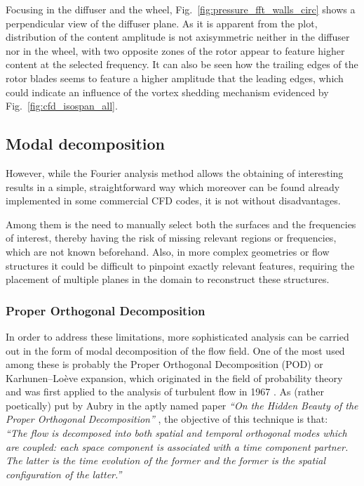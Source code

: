 Focusing in the diffuser and the wheel, Fig.~\ref{fig:pressure_fft_walls_circ} shows a perpendicular view of the diffuser plane. As it is apparent from the plot, distribution of the content amplitude is not axisymmetric neither in the diffuser nor in the wheel, with two opposite zones of the rotor appear to feature higher content at the selected frequency. It can also be seen how the trailing edges of the rotor blades seems to feature a higher amplitude that the leading edges, which could indicate an influence of the vortex shedding mechanism evidenced by Fig.~\ref{fig:cfd_isospan_all}.

\subsection{Modal decomposition}

However, while the Fourier analysis method allows the obtaining of interesting results in a simple, straightforward way which moreover can be found already implemented in some commercial CFD codes, it is not without disadvantages.

Among them is the need to manually select both the surfaces and the frequencies of interest, thereby having the risk of missing relevant regions or frequencies, which are not known beforehand. Also, in more complex geometries or flow structures it could be difficult to pinpoint exactly relevant features, requiring the placement of multiple planes in the domain to reconstruct these structures.

\subsubsection{Proper Orthogonal Decomposition}

In order to address these limitations, more sophisticated analysis can be carried out in the form of modal decomposition of the flow field. One of the most used among these is probably the Proper Orthogonal Decomposition (POD) or Karhunen--Loève expansion, which originated in the field of probability theory and was first applied to the analysis of turbulent flow in 1967 \cite{lumley1967structure}. As (rather poetically) put by Aubry in the aptly named paper \emph{``On the Hidden Beauty of the Proper Orthogonal Decomposition''} \cite{aubry1991hidden}, the objective of this technique is that:\\

\emph{``The flow is decomposed into both spatial and temporal orthogonal modes which are coupled: each space component is associated with a time component partner. The latter is the time evolution of the former and the former is the spatial configuration of the latter.''}\\

